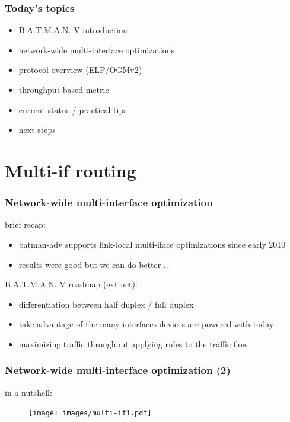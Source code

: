 \documentclass[slidestop]{beamer}
\begin{document}
\begin{frame}[c]
	\frametitle{Today's topics}
	\begin{itemize}
		\item B.A.T.M.A.N. V introduction
		\item network-wide multi-interface optimizations
		\item protocol overview (ELP/OGMv2)
		\item throughput based metric
		\item current status / practical tips
		\item next steps
	\end{itemize}
\end{frame}

\section{Multi-if routing}
\begin{frame}[c]
	\frametitle{Network-wide multi-interface optimization}

	brief recap:

	\begin{itemize}
		\item batman-adv supports link-local multi-iface optimizations since early 2010
		\item results were good but we can do better ..
	\end{itemize}

	\addvspace{1.0cm}

	B.A.T.M.A.N. V roadmap (extract):

	\begin{itemize}
		\item differentiation between half duplex / full duplex
		\item take advantage of the many interfaces devices are powered with today
		\item maximizing traffic throughput applying rules to the traffic flow
	\end{itemize}
\end{frame}

\begin{frame}[c]
	\frametitle{Network-wide multi-interface optimization (2)}

	in a nutshell:
	\begin{figure}
		\centering
		\texttt{[image: images/multi-if1.pdf]}
	\end{figure}
\end{frame}
\end{document}
